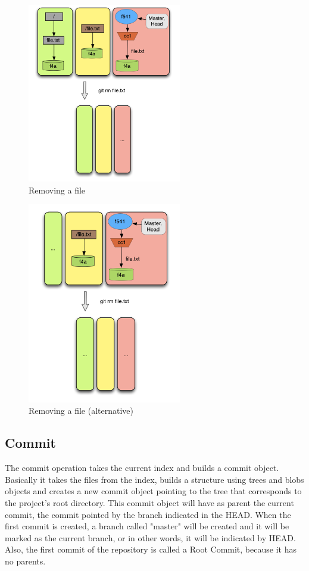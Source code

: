 \begin{figure}[!h]
   \centering
   \includegraphics[width=0.6\textwidth]{images/remove1.png}
   \caption{Removing a file}\label{fig:remove1}
\end{figure}

\begin{figure}[!h]
   \centering
   \includegraphics[width=0.6\textwidth]{images/remove2.png}
   \caption{Removing a file (alternative)}\label{fig:remove2}
\end{figure}



\subsection{Commit}
The commit operation takes the current index and builds a commit
object. Basically it takes the files from the index, builds a
structure using trees and blobs objects and creates a new commit
object pointing to the tree that corresponds to the project's root
directory. This commit object will have as parent the current commit,
the commit pointed by the branch indicated in the HEAD.
When the first commit is created, a branch called "master" will be created
and it will be marked as the current branch, or in other words, it
will be indicated by HEAD. Also, the first commit of the repository
is called a Root Commit, because it has no parents.


